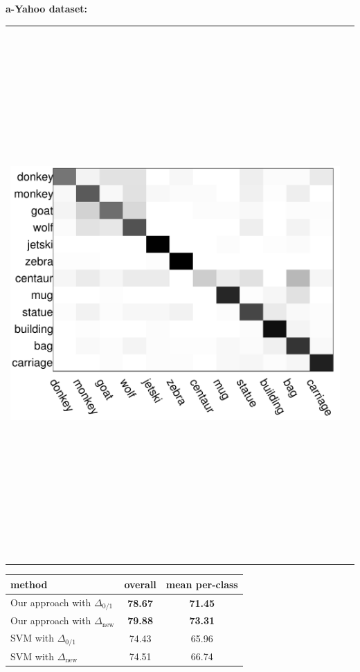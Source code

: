 \documentclass[a0]{a0poster}
\begin{document}
\begin{center}
{\vspace{2cm}

\begin{center}
{\Large\bf a-Yahoo dataset:}
\end{center}

\begin{center}
\begin{tabular}{cc}
\includegraphics[height=8in, width=11in]{fig/yahoo_conf}&
\end{tabular}
\end{center}

{\Large
\begin{center}
\begin{tabular}{|l||c|c|}
\hline
method & overall & mean per-class\\
\hline\hline
Our approach with $\Delta_{0/1}$ & {\bf 78.67} & {\bf 71.45}\\
Our approach with $\Delta_{\mathrm{new}}$ & {\bf 79.88} & {\bf 73.31}\\
\hline
SVM with $\Delta_{0/1}$ & 74.43 & 65.96\\
SVM with $\Delta_{\mathrm{new}}$ & 74.51 & 66.74\\
\hline
\end{tabular}
\end{center}
}
}

\end{center}
\end{document}
